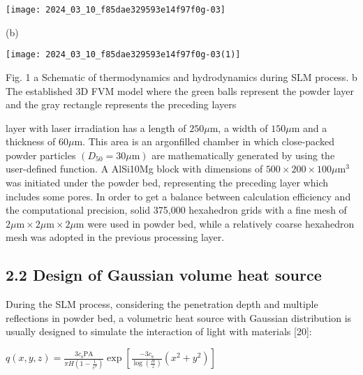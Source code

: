 \documentclass[10pt]{article}
\begin{document}
\begin{center}
\texttt{[image: 2024\_03\_10\_f85dae329593e14f97f0g-03]}
\end{center}

(b)

\begin{center}
\texttt{[image: 2024\_03\_10\_f85dae329593e14f97f0g-03(1)]}
\end{center}

Fig. 1 a Schematic of thermodynamics and hydrodynamics during SLM process. b The established 3D FVM model where the green balls represent the powder layer and the gray rectangle represents the preceding layers

layer with laser irradiation has a length of $250 \mu \mathrm{m}$, a width of $150 \mu \mathrm{m}$ and a thickness of $60 \mu \mathrm{m}$. This area is an argonfilled chamber in which close-packed powder particles $\left(D_{50}=30 \mu \mathrm{m}\right)$ are mathematically generated by using the user-defined function. A AlSi10Mg block with dimensions of $500 \times 200 \times 100 \mu \mathrm{m}^{3}$ was initiated under the powder bed, representing the preceding layer which includes some pores. In order to get a balance between calculation efficiency and the computational precision, solid 375,000 hexahedron grids with a fine mesh of $2 \mu \mathrm{m} \times 2 \mu \mathrm{m} \times 2 \mu \mathrm{m}$ were used in powder bed, while a relatively coarse hexahedron mesh was adopted in the previous processing layer.

\subsection*{2.2 Design of Gaussian volume heat source}
During the SLM process, considering the penetration depth and multiple reflections in powder bed, a volumetric heat source with Gaussian distribution is usually designed to simulate the interaction of light with materials [20]:

$q(x, y, z)=\frac{3 c_{\mathrm{s}} \mathrm{PA}}{\pi H\left(1-\frac{1}{e^{3}}\right)} \exp \left[\frac{-3 c_{\mathrm{s}}}{\log \left(\frac{H}{z}\right)}\left(x^{2}+y^{2}\right)\right]$
\end{document}
